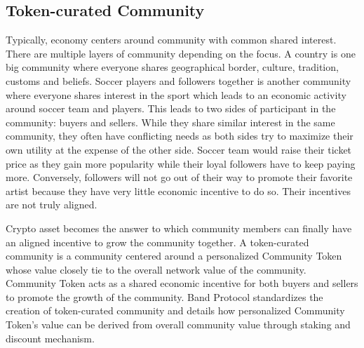\documentclass[letterpaper,11pt]{article}
\begin{document}
\subsection{Token-curated Community}
Typically, economy centers around community with common shared interest. There are multiple layers of community depending on the focus. A country is one big community where everyone shares geographical border, culture, tradition, customs and beliefs. Soccer players and followers together is another community where everyone shares interest in the sport which leads to an economic activity around soccer team and players. This leads to two sides of participant in the community: buyers and sellers. While they share similar interest in the same community, they often have conflicting needs as both sides try to maximize their own utility at the expense of the other side. Soccer team would raise their ticket price as they gain more popularity while their loyal followers have to keep paying more. Conversely, followers will not go out of their way to promote their favorite artist because they have very little economic incentive to do so. Their incentives are not truly aligned.

Crypto asset becomes the answer to which community members can finally have an aligned incentive to grow the community together. A token-curated community is a community centered around a personalized Community Token whose value closely tie to the overall network value of the community. Community Token acts as a shared economic incentive for both buyers and sellers to promote the growth of the community. Band Protocol standardizes the creation of token-curated community and details how personalized Community Token's value can be derived from overall community value through staking and discount mechanism.

\end{document}
